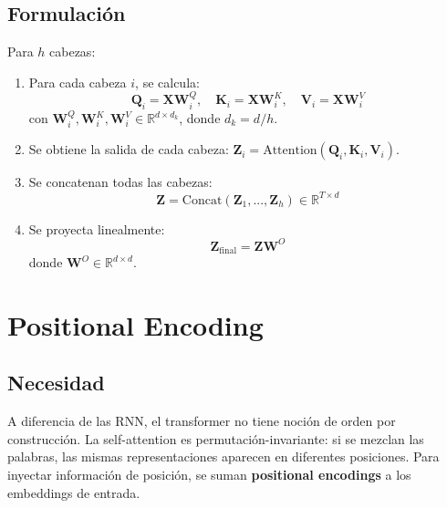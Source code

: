 \documentclass[12pt,a4paper,openany,oneside]{book}
\begin{document}
\subsection{Formulación}
Para \(h\) cabezas:
\begin{enumerate}
    \item Para cada cabeza \(i\), se calcula:
    \[
    \mathbf{Q}_i = \mathbf{X} \mathbf{W}_i^Q,\quad 
    \mathbf{K}_i = \mathbf{X} \mathbf{W}_i^K,\quad 
    \mathbf{V}_i = \mathbf{X} \mathbf{W}_i^V
    \]
    con \(\mathbf{W}_i^Q, \mathbf{W}_i^K, \mathbf{W}_i^V \in \mathbb{R}^{d \times d_k}\), donde \(d_k = d/h\).
    \item Se obtiene la salida de cada cabeza: \(\mathbf{Z}_i = \text{Attention}(\mathbf{Q}_i, \mathbf{K}_i, \mathbf{V}_i)\).
    \item Se concatenan todas las cabezas:
    \[
    \mathbf{Z} = \text{Concat}(\mathbf{Z}_1, ..., \mathbf{Z}_h) \in \mathbb{R}^{T \times d}
    \]
    \item Se proyecta linealmente:
    \[
    \mathbf{Z}_{\text{final}} = \mathbf{Z} \mathbf{W}^O
    \]
    donde \(\mathbf{W}^O \in \mathbb{R}^{d \times d}\).
\end{enumerate}

\begin{center}
\caption{Esquema de atención multi-head.}
\end{center}

\section{Positional Encoding}

\subsection{Necesidad}
A diferencia de las RNN, el transformer no tiene noción de orden por construcción. La self-attention es permutación-invariante: si se mezclan las palabras, las mismas representaciones aparecen en diferentes posiciones. Para inyectar información de posición, se suman \textbf{positional encodings} a los embeddings de entrada.
\end{document}
